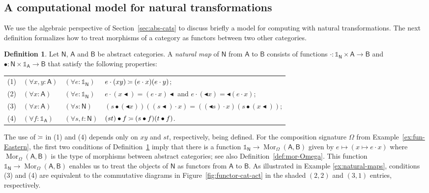 \documentclass{amsart}
\newcommand{\tin}{:}
\newcommand{\Cat}[1]{\mathsf{#1}}
\newcommand{\cat}[1]{\Cat{#1}}
\newcommand{\acat}[1]{\mathsf{#1}}
\numberwithin{lstfloat}{section}
\DeclareMathOperator{\ftor}{Mor}
\newcommand{\srcfunc}{\mathbin{\blacktriangleleft}}
\newcommand{\tgtfunc}{\mathbin{\blacktriangleleft}}
\newcommand{\src}[1]{#1\srcfunc}
\newcommand{\tgt}[1]{\tgtfunc #1}
\newcommand{\one}{\mathbb{1}}
\newcommand{\venturi}{%
  \mathrel{
    \begin{tikzpicture}[yscale=0.6,xscale=0.5]
        \draw (0ex,2.5ex) to (1ex,2ex);
        \draw (1ex,2ex) to (3ex,2ex);
        \draw (0ex,0.75ex) to (1ex,1.25ex);
        \draw (1ex,1.25ex) to (3ex,1.25ex);
    \end{tikzpicture}
  }
}
\theoremstyle{definition}
\newtheorem{defn}[thm]{Definition}
\theoremstyle{remark}
\numberwithin{equation}{section}
\begin{document}
\subsection{A computational model for natural transformations}
\label{sec:comp-nat-trans}

We use the algebraic perspective of Section~\ref{sec:abs-cats} to discuss briefly a
model for computing with natural transformations. The next definition formalizes
how to treat morphisms of a category as functors between two other
categories.

\begin{defn}\label{def:natural-action}
  Let $\acat{N}$, $\acat{A}$ and $\acat{B}$ be abstract categories. A
  \emph{natural map} of $\acat{N}$ from $\acat{A}$ to $\acat{B}$ consists of
  functions $\cdot : \one_{\acat{N}} \times \acat{A} \to \acat{B}$ and
  $\bullet : \acat{N} \times \one_{\acat{A}} \to \acat{B}$ that satisfy the
  following properties:\\[1ex]
  \hspace*{0.5cm}\begin{tabular}{llll}
   (1) & $(\forall x,y\tin\acat{A})$& $(\forall e:\one_{\acat{N}})$ &  $e\cdot (xy)\venturi (e\cdot x)(e\cdot y)$;\\[0.5ex]
    (2) & $(\forall x\tin\acat{A})$& $(\forall e:\one_{\acat{N}})$ &  $e\cdot (\src{x}) = \src{(e \cdot x)}$\; and\; $e\cdot (\tgt{x}) = \tgt{(e\cdot x)}$;\\[0.5ex]
    (3) & $(\forall x\tin\acat{A})$& $(\forall s:\acat{N})$  & $(s \bullet (\tgt{x}))((\src{s})\cdot x)     = ((\tgt{s})\cdot x)(s\bullet (\src{x}))$;\\[0.5ex]
   (4) &  $(\forall f:\one_{\acat{A}})$& $(\forall s,t \tin \acat{N})$ & $(st)\bullet f \venturi (s \bullet f)(t\bullet f)$.
  \end{tabular}
\end{defn}

The use of $\venturi$ in (1) and (4) depends only on $xy$ and $st$,
respectively, being defined. For the composition signature $\Omega$ from
Example~\ref{ex:fun-Eastern}, the first two conditions of
Definition~\ref{def:natural-action} imply that there is a function
$\one_{\acat{N}} \to \ftor_{\Omega}(\acat{A}, \acat{B})$ given by $e\mapsto
(x\mapsto e\cdot x)$ where $\ftor_{\Omega}(\acat{A}, \acat{B})$ is the type of
morphisms between abstract categories; see also Definition~\ref{def:mor-Omega}.
This function $\one_{\acat{N}} \to \ftor_{\Omega}(\acat{A}, \acat{B})$ enables
us to treat the objects of $\cat{N}$ as functors from $\cat{A}$ to $\cat{B}$. As
illustrated in Example \ref{ex:natural-maps}, conditions (3) and (4) are
equivalent to the commutative diagrams in Figure~\ref{fig:functor-cat-act} in
the shaded $(2,2)$ and $(3,1)$ entries, respectively.
\end{document}
